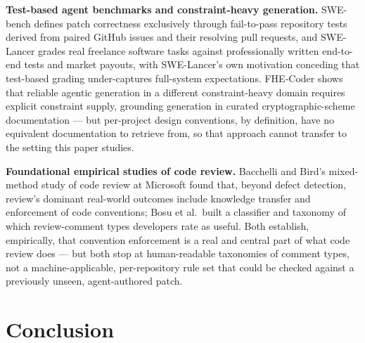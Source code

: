 \documentclass[11pt]{article}
\begin{document}
\textbf{Test-based agent benchmarks and constraint-heavy generation.} SWE-bench defines patch correctness exclusively through fail-to-pass repository tests derived from paired GitHub issues and their resolving pull requests, and SWE-Lancer grades real freelance software tasks against professionally written end-to-end tests and market payouts, with SWE-Lancer's own motivation conceding that test-based grading under-captures full-system expectations. FHE-Coder shows that reliable agentic generation in a different constraint-heavy domain requires explicit constraint supply, grounding generation in curated cryptographic-scheme documentation --- but per-project design conventions, by definition, have no equivalent documentation to retrieve from, so that approach cannot transfer to the setting this paper studies.

\textbf{Foundational empirical studies of code review.} Bacchelli and Bird's mixed-method study of code review at Microsoft found that, beyond defect detection, review's dominant real-world outcomes include knowledge transfer and enforcement of code conventions; Bosu et al.\ built a classifier and taxonomy of which review-comment types developers rate as useful. Both establish, empirically, that convention enforcement is a real and central part of what code review does --- but both stop at human-readable taxonomies of comment types, not a machine-applicable, per-repository rule set that could be checked against a previously unseen, agent-authored patch.

\section{Conclusion}
\end{document}
